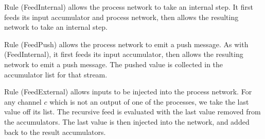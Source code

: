 Rule (FeedInternal) allows the process network to take an internal step.
It first feeds its input accumulator and process network, then allows the resulting network to take an internal step.

Rule (FeedPush) allows the process network to emit a push message.
As with (FeedInternal), it first feeds its input accumulator, then allows the resulting network to emit a push message.
The pushed value is collected in the accumulator list for that stream.

Rule (FeedExternal) allows inputs to be injected into the process network.
For any channel $c$ which is not an output of one of the processes, we take the last value off its list.
The recursive feed is evaluated with the last value removed from the accumulators.
The last value is then injected into the network, and added back to the result accumulators.









